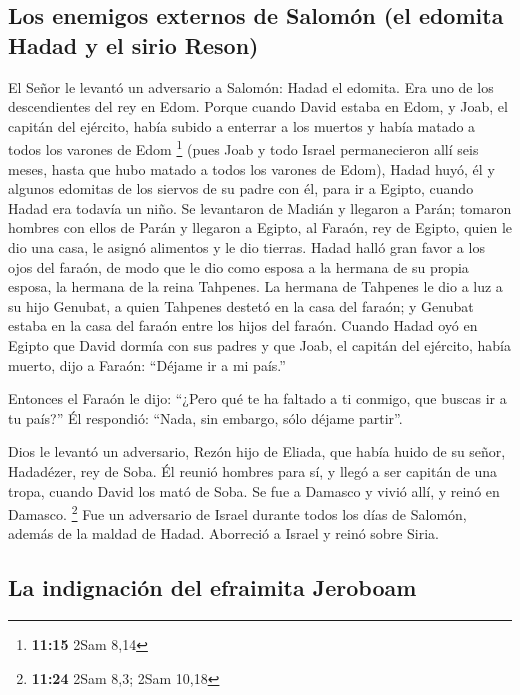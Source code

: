 \begin{paracol}{2}
\hypertarget{los-enemigos-externos-de-salomuxf3n-el-edomita-hadad-y-el-sirio-reson}{%
\subsection{Los enemigos externos de Salomón (el edomita Hadad y el
sirio
Reson)}\label{los-enemigos-externos-de-salomuxf3n-el-edomita-hadad-y-el-sirio-reson}}

 El Señor le levantó un adversario a Salomón: Hadad el
edomita. Era uno de los descendientes del rey en Edom. 
Porque cuando David estaba en Edom, y Joab, el capitán del ejército,
había subido a enterrar a los muertos y había matado a todos los varones
de Edom \footnote{\textbf{11:15} 2Sam 8,14}  (pues Joab y
todo Israel permanecieron allí seis meses, hasta que hubo matado a todos
los varones de Edom),  Hadad huyó, él y algunos edomitas
de los siervos de su padre con él, para ir a Egipto, cuando Hadad era
todavía un niño.  Se levantaron de Madián y llegaron a
Parán; tomaron hombres con ellos de Parán y llegaron a Egipto, al
Faraón, rey de Egipto, quien le dio una casa, le asignó alimentos y le
dio tierras.  Hadad halló gran favor a los ojos del
faraón, de modo que le dio como esposa a la hermana de su propia esposa,
la hermana de la reina Tahpenes.  La hermana de Tahpenes
le dio a luz a su hijo Genubat, a quien Tahpenes destetó en la casa del
faraón; y Genubat estaba en la casa del faraón entre los hijos del
faraón.  Cuando Hadad oyó en Egipto que David dormía con
sus padres y que Joab, el capitán del ejército, había muerto, dijo a
Faraón: ``Déjame ir a mi país.''

 Entonces el Faraón le dijo: ``¿Pero qué te ha faltado a
ti conmigo, que buscas ir a tu país?'' Él respondió: ``Nada, sin
embargo, sólo déjame partir''.

 Dios le levantó un adversario, Rezón hijo de Eliada, que
había huido de su señor, Hadadézer, rey de Soba.  Él
reunió hombres para sí, y llegó a ser capitán de una tropa, cuando David
los mató de Soba. Se fue a Damasco y vivió allí, y reinó en Damasco.
\footnote{\textbf{11:24} 2Sam 8,3; 2Sam 10,18}  Fue un
adversario de Israel durante todos los días de Salomón, además de la
maldad de Hadad. Aborreció a Israel y reinó sobre Siria.

\hypertarget{la-indignaciuxf3n-del-efraimita-jeroboam}{%
\subsection{La indignación del efraimita
Jeroboam}\label{la-indignaciuxf3n-del-efraimita-jeroboam}}


\end{paracol}
